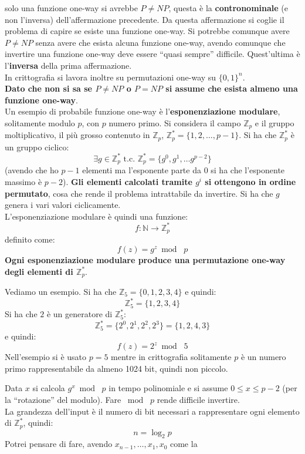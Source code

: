 \documentclass[a4paper,12pt, oneside]{book}
\begin{document}
solo una funzione one-way si avrebbe $P\neq NP$, questa è la
\textbf{contronominale} (e non l'inversa) dell'affermazione precedente. Da
questa affermazione si coglie il problema di capire se esiste una funzione
one-way. Si potrebbe comunque avere 
$P\neq NP$ senza avere che esista alcuna funzione one-way, avendo comunque che
invertire una funzione one-way deve essere ``quasi sempre''
difficile. Quest'ultima è l'\textbf{inversa} della prima affermazione.\\
In crittografia si lavora inoltre su permutazioni one-way su $\{0,1\}^n$.\\
\textbf{Dato che non si sa se $P\neq NP$ o $P=NP$ si assume che esista almeno
  una funzione one-way}.\\
Un esempio di probabile funzione one-way è l'\textbf{esponenziazione modulare},
solitamente modulo $p$, con $p$ numero primo. Si considera il campo
$\mathbb{Z}_p$ e il gruppo moltiplicativo, il più grosso contenuto in
$\mathbb{Z}_p$, $\mathbb{Z}^*_p=\{1,2,\ldots, p-1\}$.  Si ha che
$\mathbb{Z}^*_p$ è un gruppo ciclico:
\[\exists g\in \mathbb{Z}^*_p \mbox{ t.c. } \mathbb{Z}^*_p=\{g^0,g^1,\ldots
  g^{p-2}\}\]
(avendo che ho $p-1$ elementi ma l'esponente parte da 0 si ha che l'esponente
massimo è $p-2$). \textbf{Gli elementi calcolati tramite $g^i$ si ottengono in
  ordine permutato}, cosa che rende il problema intrattabile da invertire. Si ha
che $g$ genera i vari valori ciclicamente.\\ 
L'esponenziazione modulare è quindi una funzione:
\[f:\mathbb{N}\to \mathbb{Z}^*_p\]
definito come:
\[f(z)=g^z\bmod\,\,p\]
\textbf{Ogni esponenziazione modulare produce una permutazione one-way degli
  elementi di $\mathbb{Z}^*_p$}.
\begin{esempio}
  Vediamo un esempio.
  Si ha che $\mathbb{Z}_5=\{0,1,2,3,4\}$ e quindi:
  \[\mathbb{Z}^*_5=\{1,2,3,4\}\]
  Si ha che $2$ è un generatore di $\mathbb{Z}^*_5$:
  \[\mathbb{Z}^*_5=\{2^0,2^1,2^2,2^3\}=\{1,2,4,3\}\]
  e quindi:
  \[f(z)=2^z\bmod\,\,5\]
  Nell'esempio si è usato $p=5$ mentre in crittografia solitamente $p$ è un
  numero primo rappresentabile da almeno 1024 bit, quindi non piccolo.
\end{esempio}
Data $x$ si calcola $g^x\bmod\,\,p$ in tempo polinomiale e si assume $0\leq
x\leq p-2$ (per la ``rotazione'' del modulo). Fare $\bmod\,\,p$ rende difficile
invertire. \\ 
La grandezza dell'input è il numero di bit necessari a rappresentare ogni
elemento di $\mathbb{Z}^*_p$, quindi:
\[n=\log_2p\]
Potrei pensare di fare, avendo $x_{n-1},\ldots, x_1, x_0$ come la
\end{document}
